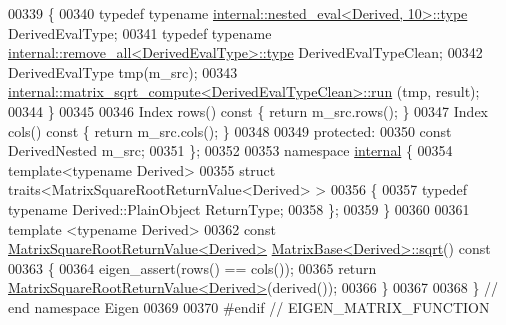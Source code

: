 \begin{DoxyCode}
00339 \textcolor{keyword}{    }\{
00340       \textcolor{keyword}{typedef} \textcolor{keyword}{typename} \hyperlink{class_eigen_1_1internal_1_1_tensor_lazy_evaluator_writable}{internal::nested\_eval<Derived, 10>::type} 
      DerivedEvalType;
00341       \textcolor{keyword}{typedef} \textcolor{keyword}{typename} \hyperlink{group___sparse_core___module}{internal::remove\_all<DerivedEvalType>::type}
       DerivedEvalTypeClean;
00342       DerivedEvalType tmp(m\_src);
00343       \hyperlink{struct_eigen_1_1internal_1_1matrix__sqrt__compute_a29c137f6d7c0cbe4df034be5aed427f6}{internal::matrix\_sqrt\_compute<DerivedEvalTypeClean>::run}
      (tmp, result);
00344     \}
00345 
00346     Index rows()\textcolor{keyword}{ const }\{ \textcolor{keywordflow}{return} m\_src.rows(); \}
00347     Index cols()\textcolor{keyword}{ const }\{ \textcolor{keywordflow}{return} m\_src.cols(); \}
00348 
00349   \textcolor{keyword}{protected}:
00350     \textcolor{keyword}{const} DerivedNested m\_src;
00351 \};
00352 
00353 \textcolor{keyword}{namespace }\hyperlink{namespaceinternal}{internal} \{
00354 \textcolor{keyword}{template}<\textcolor{keyword}{typename} Derived>
00355 \textcolor{keyword}{struct }traits<MatrixSquareRootReturnValue<Derived> >
00356 \{
00357   \textcolor{keyword}{typedef} \textcolor{keyword}{typename} Derived::PlainObject ReturnType;
00358 \};
00359 \}
00360 
00361 \textcolor{keyword}{template} <\textcolor{keyword}{typename} Derived>
00362 \textcolor{keyword}{const} \hyperlink{class_eigen_1_1_matrix_square_root_return_value}{MatrixSquareRootReturnValue<Derived>} 
      \hyperlink{group___core___module_class_eigen_1_1_matrix_base}{MatrixBase<Derived>::sqrt}()\textcolor{keyword}{ const}
00363 \textcolor{keyword}{}\{
00364   eigen\_assert(rows() == cols());
00365   \textcolor{keywordflow}{return} \hyperlink{class_eigen_1_1_matrix_square_root_return_value}{MatrixSquareRootReturnValue<Derived>}(derived());
00366 \}
00367 
00368 \} \textcolor{comment}{// end namespace Eigen}
00369 
00370 \textcolor{preprocessor}{#endif // EIGEN\_MATRIX\_FUNCTION}
\end{DoxyCode}
